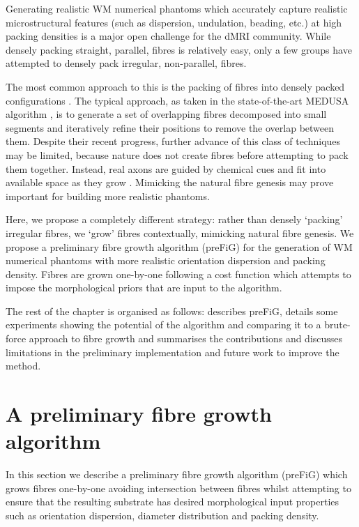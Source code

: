 Generating realistic WM numerical phantoms which accurately capture realistic microstructural features (such as dispersion, undulation, beading, etc.) at high packing densities is a major open challenge for the dMRI community.
While densely packing straight, parallel, fibres is relatively easy, only a few groups have attempted to densely pack irregular, non-parallel, fibres.

The most common approach to this is the packing of fibres into densely packed configurations \cite{Close2009,Ginsburger2018,Ginsburger2019,Rafael-Patino2018}.
The typical approach, as taken in the state-of-the-art MEDUSA algorithm \cite{Ginsburger2019}, is to generate a set of overlapping fibres decomposed into small segments and iteratively refine their positions to remove the overlap between them.
Despite their recent progress, further advance of this class of techniques may be limited, because nature does not create fibres before attempting to pack them together.
Instead, real axons are guided by chemical cues and fit into available space as they grow \cite{Price2017,Lowery2009}.
Mimicking the natural fibre genesis may prove important for building more realistic phantoms.

Here, we propose a completely different strategy: rather than densely `packing' irregular fibres, we `grow' fibres contextually, mimicking natural fibre genesis.
We propose a preliminary fibre growth algorithm (\ac{preFiG}) for the generation of WM numerical phantoms with more realistic orientation dispersion and packing density.
Fibres are grown one-by-one following a cost function which attempts to impose the morphological priors that are input to the algorithm.

The rest of the chapter is organised as follows:  describes \ac{preFiG},  details some experiments showing the potential of the algorithm and comparing it to a brute-force approach to fibre growth and  summarises the contributions and discusses limitations in the preliminary implementation and future work to improve the method.


\section{A preliminary fibre growth algorithm}
\label{sec:ipmi_config_description}
In this section we describe a preliminary fibre growth algorithm (\acs{preFiG}) which grows fibres one-by-one avoiding intersection between fibres whilst attempting to ensure that the resulting substrate has desired morphological input properties such as orientation dispersion, diameter distribution and packing density.

